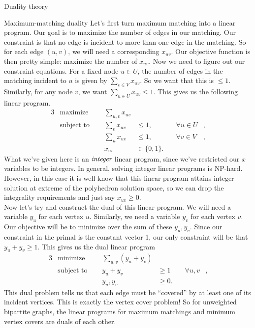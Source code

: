 \begin{section}{Duality theory}
\begin{subsection}{Maximum-matching duality}
	Let's first turn maximum matching into a linear program. Our goal is to maximize the number 
	of edges in our matching. Our constraint is that no edge is incident to more than one edge 
	in the matching. So for each edge $(u,v)$, we will need a corresponding $x_{uv}$. Our objective 
	function is then pretty simple: maximize the number of $x_{uv}$. Now we need to figure out 
	our constraint equations. For a fixed node $u\in U$, the number of edges in the matching 
	incident 
	to $u$ is given by $\sum_{v\in V} x_{uv}$. So we want that this is $\leq 1$. Similarly, for any 
	node $v$, we want $\sum_{u\in U} x_{uv} \leq 1$. This gives us the following linear program.
	\begin{alignat}{3}
		& \text{maximize } & \sum_{u,v} x_{uv}& \\
		& \text{subject to } \quad & \sum_{v} x_{uv} & \leq 1, & \quad \forall u\in U&, \\
				     &\quad & \sum_{u} x_{uv} & \leq 1, & \quad \forall v\in V &, \\
				&& x_{uv} & \in \{0,1\}.
	\end{alignat}
	What we've given here is an $\emph{integer}$ linear program, since we've restricted our 
	$x$ variables to be integers. In general, solving integer linear programs is NP-hard. However, 
	in this case it is well know that this linear program attains integer solution at extreme 
	of the polyhedron solution space, so we can drop the integrality requirements and just say 
	$x_{uv} \geq 0$.\\
	Now let's try and construct the dual of this linear program. We will need a variable 
	$y_u$ for each vertex $u$. Similarly, we need a variable $y_v$ for each vertex $v$. Our 
	objective will be to minimize over the sum of these $y_u,y_v$. Since our constraint 
	in the primal is the constant vector 1, our only constraint will be that $y_u + y_v \geq 1$. 
	This gives us the dual linear program
	\begin{alignat}{3}
		& \text{minimize } & \sum_{u,v} (y_u + y_v)& \\
		& \text{subject to } \quad & y_u + y_v & \geq 1 & \quad \forall u,v &, \\
				    && y_u,y_v & \geq 0.
	\end{alignat}
	This dual problem tells us that each edge must be ``covered'' by at least one of its incident 
	vertices. This is exactly the vertex cover problem! So for unweighted bipartite graphs, the 
	linear programs for maximum matchings and minimum vertex covers are duals of each other. 

\end{subsection}
\end{section}
